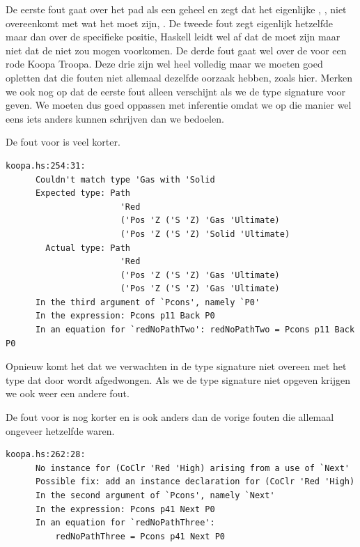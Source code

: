De eerste fout gaat over het pad als een geheel en zegt dat het eigenlijke
, , niet overeenkomt met wat het moet zijn,
. De tweede fout zegt eigenlijk hetzelfde maar dan over de
specifieke positie, Haskell leidt wel af dat de  
moet zijn maar niet dat de   niet zou mogen
voorkomen. De derde fout gaat wel over de  voor een rode Koopa
Troopa. Deze drie zijn wel heel volledig maar we moeten goed opletten dat die
fouten niet allemaal dezelfde oorzaak hebben, zoals hier. Merken we ook nog op
dat de eerste fout alleen verschijnt als we de type signature voor
 geven. We moeten dus goed oppassen met inferentie omdat we
op die manier wel eens iets anders kunnen schrijven dan we bedoelen.

De fout voor  is veel korter.

\begin{Verbatim}[fontsize=\small]
  koopa.hs:254:31:
      Couldn't match type 'Gas with 'Solid
      Expected type: Path
                       'Red
                       ('Pos 'Z ('S 'Z) 'Gas 'Ultimate)
                       ('Pos 'Z ('S 'Z) 'Solid 'Ultimate)
        Actual type: Path
                       'Red
                       ('Pos 'Z ('S 'Z) 'Gas 'Ultimate)
                       ('Pos 'Z ('S 'Z) 'Gas 'Ultimate)
      In the third argument of `Pcons', namely `P0'
      In the expression: Pcons p11 Back P0
      In an equation for `redNoPathTwo': redNoPathTwo = Pcons p11 Back P0
\end{Verbatim}

Opnieuw komt het  dat we verwachten in de type signature niet
overeen met het type dat door  wordt afgedwongen. Als we de type
signature niet opgeven krijgen we ook weer een andere fout.

De fout voor  is nog korter en is ook anders dan de
vorige fouten die allemaal ongeveer hetzelfde waren.

\begin{Verbatim}[fontsize=\small]
  koopa.hs:262:28:
      No instance for (CoClr 'Red 'High) arising from a use of `Next'
      Possible fix: add an instance declaration for (CoClr 'Red 'High)
      In the second argument of `Pcons', namely `Next'
      In the expression: Pcons p41 Next P0
      In an equation for `redNoPathThree':
          redNoPathThree = Pcons p41 Next P0
\end{Verbatim}

